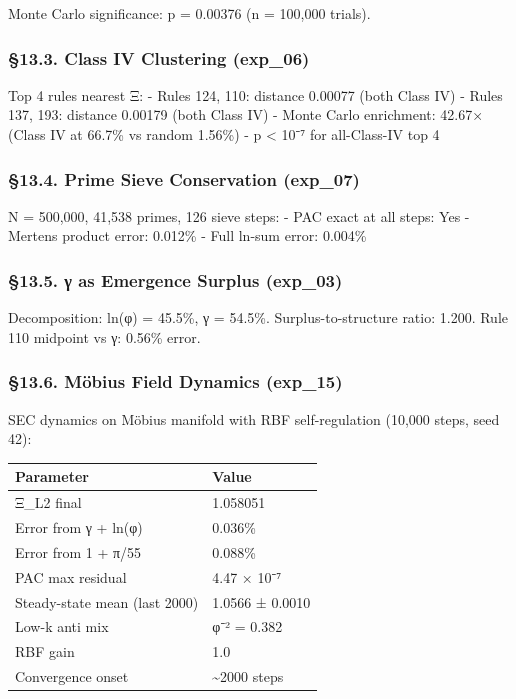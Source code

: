 \documentclass[
  11pt,
  a4paper]{article}
\begin{document}
Monte Carlo significance: p = 0.00376 (n = 100,000 trials).

\subsubsection{§13.3. Class IV Clustering
(exp\_06)}\label{class-iv-clustering-exp_06}

Top 4 rules nearest Ξ: - Rules 124, 110: distance 0.00077 (both Class
IV) - Rules 137, 193: distance 0.00179 (both Class IV) - Monte Carlo
enrichment: 42.67× (Class IV at 66.7\% vs random 1.56\%) - p \textless{}
10⁻⁷ for all-Class-IV top 4

\subsubsection{§13.4. Prime Sieve Conservation
(exp\_07)}\label{prime-sieve-conservation-exp_07}

N = 500,000, 41,538 primes, 126 sieve steps: - PAC exact at all steps:
Yes - Mertens product error: 0.012\% - Full ln-sum error: 0.004\%

\subsubsection{§13.5. γ as Emergence Surplus
(exp\_03)}\label{ux3b3-as-emergence-surplus-exp_03}

Decomposition: ln(φ) = 45.5\%, γ = 54.5\%. Surplus-to-structure ratio:
1.200. Rule 110 midpoint vs γ: 0.56\% error.

\subsubsection{§13.6. Möbius Field Dynamics
(exp\_15)}\label{muxf6bius-field-dynamics-exp_15}

SEC dynamics on Möbius manifold with RBF self-regulation (10,000 steps,
seed 42):

\begin{longtable}[]{@{}ll@{}}
\toprule\noalign{}
Parameter & Value \\
\midrule\noalign{}
\endhead
\bottomrule\noalign{}
\endlastfoot
Ξ\_L2 final & 1.058051 \\
Error from γ + ln(φ) & 0.036\% \\
Error from 1 + π/55 & 0.088\% \\
PAC max residual & 4.47 × 10⁻⁷ \\
Steady-state mean (last 2000) & 1.0566 ± 0.0010 \\
Low-k anti mix & φ⁻² = 0.382 \\
RBF gain & 1.0 \\
Convergence onset & \textasciitilde2000 steps \\
\end{longtable}
\end{document}

